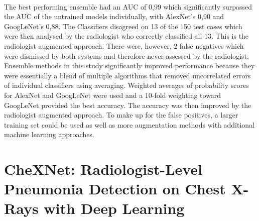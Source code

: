 \\
The best performing ensemble had an AUC of 0,99 which significantly surpassed the AUC of the untrained models individually, with AlexNet’s 0,90 and GoogLeNet’s 0,88. The Classifiers disagreed on 13 of the 150 test cases which were then analysed by the radiologist who correctly classified all 13. This is the radiologist augmented approach. There were, however, 2 false negatives which were dismissed by both systems and therefore never assessed by the radiologist.\newline
\\
Ensemble methods in this study significantly improved performance because they were essentially a blend of multiple algorithms that removed uncorrelated errors of individual classifiers using averaging. Weighted averages of probability scores for AlexNet and GoogLeNet were used and a 10-fold weighting toward GoogLeNet provided the best accuracy. The accuracy was then improved by the radiologist augmented approach. To make up for the false positives, a larger training set could be used as well as more augmentation methods with additional machine learning approaches.

\newpage
\section{CheXNet: Radiologist-Level Pneumonia Detection on Chest X-Rays with Deep Learning \cite{27}}

